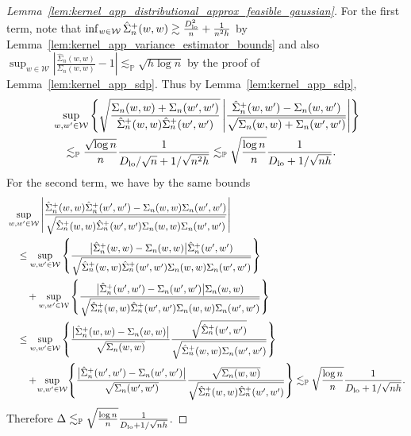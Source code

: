 \documentclass[11pt,lof]{puthesis}
\renewcommand{\P}{\ensuremath{\mathbb{P}}}
\newcommand{\cW}{\ensuremath{\mathcal{W}}}
\newcommand{\Dl}{\ensuremath{D_{\textup{lo}}}}
\theoremstyle{break}
\theoremstyle{proof}
\newtheorem{proof}{Proof}
\begin{document}
\begin{proof}[%
  Lemma~\ref{lem:kernel_app_distributional_approx_feasible_gaussian}]
  For the first term, note that
  $\inf_{w \in \cW} \hat \Sigma_n^+(w,w)
  \gtrsim \frac{\Dl^2}{n} + \frac{1}{n^2h}$
  by Lemma~\ref{lem:kernel_app_variance_estimator_bounds} and also
  $\sup_{w \in \cW}
  \left|\frac{\hat \Sigma_n(w,w)}{\Sigma_n(w,w)} - 1\right|
  \lesssim_\P \sqrt{h \log n}$
  by the proof of Lemma~\ref{lem:kernel_app_sdp}.
  Thus by Lemma~\ref{lem:kernel_app_sdp},
  \begin{align*}
    &\sup_{w, w' \in \cW}
    \left\{
      \sqrt{\frac{\Sigma_n(w,w) + \Sigma_n(w',w')}
      {\hat \Sigma_n^+(w,w) \hat \Sigma_n^+(w',w')}}
      \left|
      \frac{\hat \Sigma_n^+(w,w') - \Sigma_n(w,w')}
      {\sqrt{\Sigma_n(w,w) + \Sigma_n(w',w')}}
      \right|
    \right\} \\
    &\quad\lesssim_\P
    \frac{\sqrt{\log n}}{n}
    \frac{1}{\Dl/\sqrt{n} + 1/\sqrt{n^2h}}
    \lesssim_\P
    \sqrt{\frac{\log n}{n}}
    \frac{1}{\Dl + 1/\sqrt{n h}}.
  \end{align*}
  For the second term, we have by the same bounds
  \begin{align*}
    &\sup_{w, w' \in \cW}
    \left|
    \frac{\hat \Sigma_n^+(w,w) \hat \Sigma_n^+(w',w')
    - \Sigma_n(w,w) \Sigma_n(w',w')}
    {\sqrt{\hat \Sigma_n^+(w,w) \hat \Sigma_n^+(w',w')
    \Sigma_n(w,w) \Sigma_n(w',w')}}
    \right| \\
    &\quad\leq
    \sup_{w, w' \in \cW}
    \left\{
      \frac{\big| \hat \Sigma_n^+(w,w) - \Sigma_n(w,w)\big|
      \hat \Sigma_n^+(w',w')}
      {\sqrt{\hat \Sigma_n^+(w,w) \hat \Sigma_n^+(w',w')
      \Sigma_n(w,w) \Sigma_n(w',w')}}
    \right\} \\
    &\qquad+
    \sup_{w, w' \in \cW}
    \left\{
      \frac{\big| \hat \Sigma_n^+(w',w') - \Sigma_n(w',w')\big|
      \Sigma_n(w,w)}
      {\sqrt{\hat \Sigma_n^+(w,w) \hat \Sigma_n^+(w',w')
      \Sigma_n(w,w) \Sigma_n(w',w')}}
    \right\} \\
    &\quad\leq
    \sup_{w, w' \in \cW}
    \left\{
      \frac{\big| \hat \Sigma_n^+(w,w) - \Sigma_n(w,w)\big|}
      {\sqrt{\Sigma_n(w,w)}}
      \frac{\sqrt{\hat \Sigma_n^+(w',w')}}
      {\sqrt{\hat \Sigma_n^+(w,w) \Sigma_n(w',w')}}
    \right\} \\
    &\qquad+
    \!\sup_{w, w' \in \cW}\!
    \left\{
      \frac{\big| \hat \Sigma_n^+(w',w') - \Sigma_n(w',w')\big|}
      {\sqrt{\Sigma_n(w',w')}}
      \frac{\sqrt{\Sigma_n(w,w)}}
      {\sqrt{\hat \Sigma_n^+(w,w) \hat \Sigma_n^+(w',w')}}
    \right\}
    \lesssim_\P
    \sqrt{\frac{\log n}{n}}
    \frac{1}{\Dl + 1/\sqrt{n h}}.
  \end{align*}
  Therefore
  $\Delta \lesssim_\P \sqrt{\frac{\log n}{n}} \frac{1}{\Dl + 1/\sqrt{n h}}$.


\end{proof}
\end{document}
